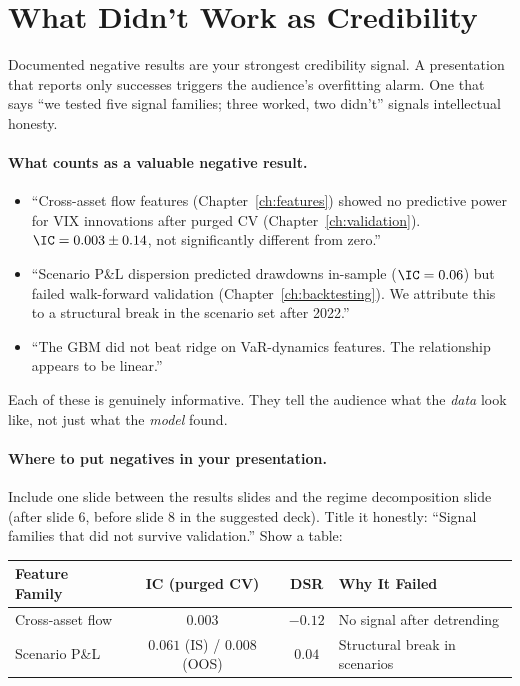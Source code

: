 \section{What Didn't Work as Credibility}
\label{sec:presenting:negatives}

Documented negative results are your strongest credibility signal.  A
presentation that reports only successes triggers the audience's
overfitting alarm.  One that says ``we tested five signal families;
three worked, two didn't'' signals intellectual honesty.

\paragraph{What counts as a valuable negative result.}

\begin{itemize}[leftmargin=1.5em]
  \item ``Cross-asset flow features (Chapter~\ref{ch:features}) showed
    no predictive power for VIX innovations after purged CV
    (Chapter~\ref{ch:validation}).  $\IC = 0.003 \pm 0.14$, not
    significantly different from zero.''
  \item ``Scenario P\&L dispersion predicted drawdowns in-sample
    ($\IC = 0.06$) but failed walk-forward validation
    (Chapter~\ref{ch:backtesting}).  We attribute this to a structural
    break in the scenario set after 2022.''
  \item ``The GBM did not beat ridge on VaR-dynamics features.  The
    relationship appears to be linear.''
\end{itemize}

Each of these is genuinely informative.  They tell the audience what the
\emph{data} look like, not just what the \emph{model} found.

\paragraph{Where to put negatives in your presentation.}
Include one slide between the results slides and the regime decomposition
slide (after slide 6, before slide 8 in the suggested deck).  Title it
honestly: ``Signal families that did not survive validation.''  Show a
table:

\medskip
\begin{center}
\begin{tabular}{lccl}
  \toprule
  \textbf{Feature Family} & \textbf{IC (purged CV)} & \textbf{DSR} &
    \textbf{Why It Failed} \\
  \midrule
  Cross-asset flow & $0.003$ & $-0.12$ & No signal after detrending \\
  Scenario P\&L    & $0.061$ (IS) / $0.008$ (OOS) & $0.04$ &
    Structural break in scenarios \\
  \bottomrule
\end{tabular}
\end{center}

